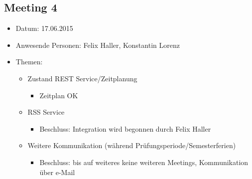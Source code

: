 \documentclass[12pt]{scrartcl}
\begin{document}
		\subsection{Meeting 4}
		\begin{itemize}
			\item Datum: 17.06.2015
			\item Anwesende Personen: Felix Haller, Konstantin Lorenz
			\item Themen:
			\begin{itemize}
				\item Zustand REST Service/Zeitplanung
				\begin{itemize}
					\item Zeitplan OK
				\end{itemize}
				\item RSS Service
				\begin{itemize}
					\item Beschluss: Integration wird begonnen durch Felix Haller
				\end{itemize}
				\item Weitere Kommunikation (während Prüfungsperiode/Semesterferien)
				\begin{itemize}
					\item Beschluss: bis auf weiteres keine weiteren Meetings, Kommunikation über e-Mail
				\end{itemize}
			\end{itemize}
		\end{itemize}
\end{document}
